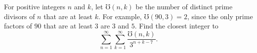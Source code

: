 For positive integers $n$ and $k$,  let $\mho(n,k)$ be the number of distinct prime divisors of $n$ that are at least $k$. For example, $\mho(90, 3)=2$,  since the only prime factors of $90$ that are at least $3$ are $3$ and $5$. Find the closest integer to\[\sum_{n=1}^\infty \sum_{k=1}^\infty \frac{\mho(n,k)}{3^{n+k-7}}.\]